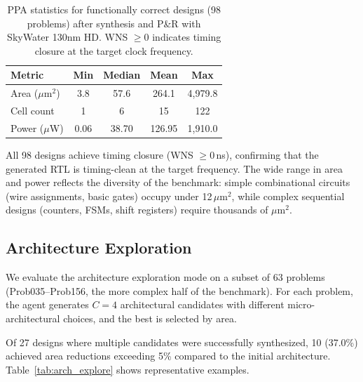 \begin{table}[t]
\centering
\caption{PPA statistics for functionally correct designs (98 problems) after synthesis and P\&R with SkyWater 130nm HD. WNS $\geq 0$ indicates timing closure at the target clock frequency.}
\label{tab:ppa_summary}
\small
\begin{tabular}{lcccc}
\toprule
\textbf{Metric} & \textbf{Min} & \textbf{Median} & \textbf{Mean} & \textbf{Max} \\
\midrule
Area ($\mu$m$^2$) & 3.8 & 57.6 & 264.1 & 4{,}979.8 \\
Cell count & 1 & 6 & 15 & 122 \\
Power ($\mu$W) & 0.06 & 38.70 & 126.95 & 1{,}910.0 \\
\bottomrule
\end{tabular}
\end{table}

All 98 designs achieve timing closure (WNS $\geq 0$\,ns), confirming that the generated RTL is timing-clean at the target frequency. The wide range in area and power reflects the diversity of the benchmark: simple combinational circuits (wire assignments, basic gates) occupy under 12\,$\mu$m$^2$, while complex sequential designs (counters, FSMs, shift registers) require thousands of $\mu$m$^2$.

\subsection{Architecture Exploration}
\label{sec:arch_results}

We evaluate the architecture exploration mode on a subset of 63 problems (Prob035--Prob156, the more complex half of the benchmark). For each problem, the agent generates $C{=}4$ architectural candidates with different micro-architectural choices, and the best is selected by area.

Of 27 designs where multiple candidates were successfully synthesized, 10 (37.0\%) achieved area reductions exceeding 5\% compared to the initial architecture. Table~\ref{tab:arch_explore} shows representative examples.

